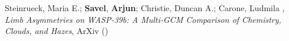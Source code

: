 \item[{\color{numcolor}\scriptsize1}] Steinrueck, Maria E.; \textbf{Savel}, \textbf{Arjun}; Christie, Duncan A.; Carone, Ludmila , \emph{Limb Asymmetries on WASP-39b: A Multi-GCM Comparison of Chemistry, Clouds, and Hazes}, ArXiv ()